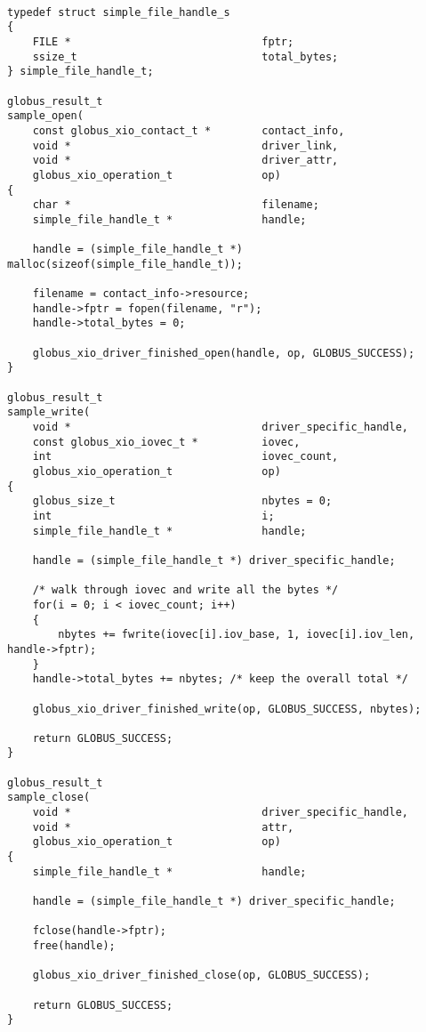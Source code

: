 \documentclass[11pt]{article}
\begin{document}
\begin{verbatim}

typedef struct simple_file_handle_s
{
    FILE *                              fptr;
    ssize_t                             total_bytes;
} simple_file_handle_t;

globus_result_t
sample_open(
    const globus_xio_contact_t *        contact_info,
    void *                              driver_link,
    void *                              driver_attr,
    globus_xio_operation_t              op)
{
    char *                              filename;
    simple_file_handle_t *              handle;

    handle = (simple_file_handle_t *) malloc(sizeof(simple_file_handle_t));

    filename = contact_info->resource;
    handle->fptr = fopen(filename, "r");
    handle->total_bytes = 0;
                   
    globus_xio_driver_finished_open(handle, op, GLOBUS_SUCCESS);
}

globus_result_t
sample_write(
    void *                              driver_specific_handle,
    const globus_xio_iovec_t *          iovec,
    int                                 iovec_count,
    globus_xio_operation_t              op)
{
    globus_size_t                       nbytes = 0;
    int                                 i;
    simple_file_handle_t *              handle;

    handle = (simple_file_handle_t *) driver_specific_handle;

    /* walk through iovec and write all the bytes */
    for(i = 0; i < iovec_count; i++)
    {
        nbytes += fwrite(iovec[i].iov_base, 1, iovec[i].iov_len, handle->fptr);
    }
    handle->total_bytes += nbytes; /* keep the overall total */

    globus_xio_driver_finished_write(op, GLOBUS_SUCCESS, nbytes);

    return GLOBUS_SUCCESS;
}

globus_result_t
sample_close(
    void *                              driver_specific_handle,
    void *                              attr,
    globus_xio_operation_t              op)
{
    simple_file_handle_t *              handle;

    handle = (simple_file_handle_t *) driver_specific_handle;

    fclose(handle->fptr);
    free(handle);

    globus_xio_driver_finished_close(op, GLOBUS_SUCCESS);

    return GLOBUS_SUCCESS;
}


\end{verbatim}
\end{document}

